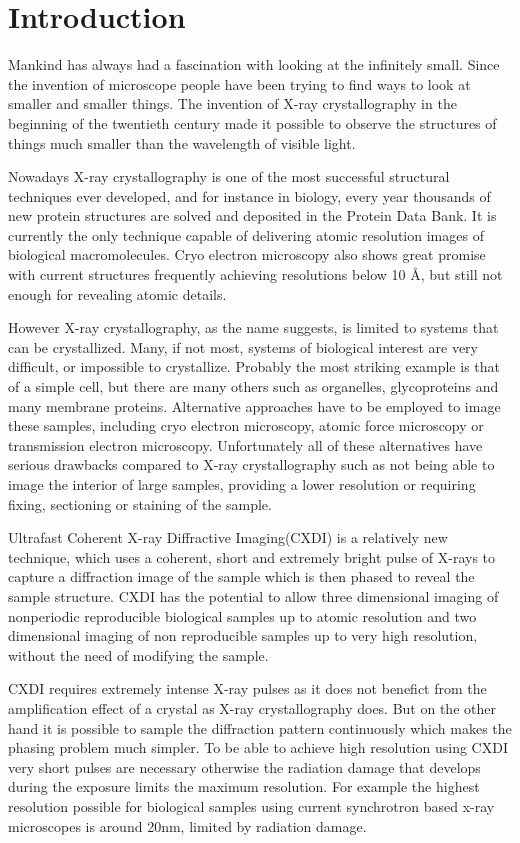 \chapter{Introduction}\label{introduction}\noindent

Mankind has always had a fascination with looking at the infinitely
small. Since the invention of microscope people have been trying to find ways to
look at smaller and smaller things. The invention of X-ray crystallography in
the beginning of the twentieth century made it possible to observe the
structures of things much smaller than the wavelength of visible light.

Nowadays X-ray crystallography is one of the most successful structural techniques ever
developed, and for instance in biology, every year thousands of new protein structures are solved and deposited
in the Protein Data Bank. It is currently the only technique capable of
delivering atomic resolution images of biological macromolecules. Cryo electron microscopy also shows great promise with current
structures frequently achieving resolutions below 10 \AA, but still not enough
for revealing atomic details.

However X-ray crystallography, as the name suggests, is limited to systems that
can be crystallized. Many, if not most, systems of biological interest are very
difficult, or impossible to crystallize. Probably the most striking example is
that of a simple cell, but there are many others such as organelles, glycoproteins and many
membrane proteins. Alternative approaches have to be employed to image these
samples, including cryo electron microscopy, atomic force microscopy or
transmission electron microscopy. Unfortunately all of these alternatives have
serious drawbacks compared to X-ray crystallography such as not being able to
image the interior of large samples, providing a lower resolution or requiring
fixing, sectioning or staining of the sample.

Ultrafast Coherent X-ray Diffractive Imaging(CXDI) is a relatively new
technique, which uses a coherent, short and extremely
bright pulse of X-rays to capture a diffraction image of the sample which is
then phased to reveal the sample structure. CXDI has the potential to allow three
dimensional imaging of nonperiodic reproducible biological samples up to atomic
resolution and two dimensional imaging of non reproducible samples up to
very high resolution, without the need of modifying the sample.

CXDI requires extremely intense X-ray pulses as it does not benefict from the
amplification effect of a crystal as X-ray crystallography does. But on the
other hand it is possible to sample the diffraction pattern continuously which
makes the phasing problem much simpler. To be able to achieve high 
resolution using CXDI very short pulses are necessary otherwise the radiation
damage that develops during the exposure limits the maximum resolution. For
example the highest resolution possible for biological samples using current
synchrotron based x-ray microscopes is around 20nm, limited by radiation
damage. \cite{Howells2009Assessment}

